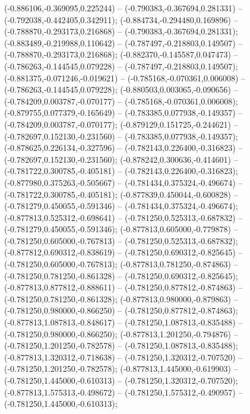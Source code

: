  (-0.886106,-0.369095,0.225244) -- (-0.790383,-0.367694,0.281331) -- (-0.792038,-0.442405,0.342911);
 (-0.884734,-0.294480,0.169896) -- (-0.788870,-0.293173,0.216868) -- (-0.790383,-0.367694,0.281331);
 (-0.883489,-0.219988,0.110642) -- (-0.787497,-0.218803,0.149507) -- (-0.788870,-0.293173,0.216868);
 (-0.882370,-0.145587,0.047473) -- (-0.786263,-0.144545,0.079228) -- (-0.787497,-0.218803,0.149507);
 (-0.881375,-0.071246,-0.019621) -- (-0.785168,-0.070361,0.006008) -- (-0.786263,-0.144545,0.079228);
 (-0.880503,0.003065,-0.090656) -- (-0.784209,0.003787,-0.070177) -- (-0.785168,-0.070361,0.006008);
 (-0.879755,0.077379,-0.165649) -- (-0.783385,0.077938,-0.149357) -- (-0.784209,0.003787,-0.070177);
 (-0.879129,0.151725,-0.244621) -- (-0.782697,0.152130,-0.231560) -- (-0.783385,0.077938,-0.149357);
 (-0.878625,0.226134,-0.327596) -- (-0.782143,0.226400,-0.316823) -- (-0.782697,0.152130,-0.231560);
 (-0.878242,0.300636,-0.414601) -- (-0.781722,0.300785,-0.405181) -- (-0.782143,0.226400,-0.316823);
 (-0.877980,0.375263,-0.505667) -- (-0.781434,0.375324,-0.496674) -- (-0.781722,0.300785,-0.405181);
 (-0.877839,0.450044,-0.600828) -- (-0.781279,0.450055,-0.591346) -- (-0.781434,0.375324,-0.496674);
 (-0.877813,0.525312,-0.698641) -- (-0.781250,0.525313,-0.687832) -- (-0.781279,0.450055,-0.591346);
 (-0.877813,0.605000,-0.779878) -- (-0.781250,0.605000,-0.767813) -- (-0.781250,0.525313,-0.687832);
 (-0.877812,0.690312,-0.838619) -- (-0.781250,0.690312,-0.825645) -- (-0.781250,0.605000,-0.767813);
 (-0.877813,0.781250,-0.874863) -- (-0.781250,0.781250,-0.861328) -- (-0.781250,0.690312,-0.825645);
 (-0.877813,0.877812,-0.888611) -- (-0.781250,0.877812,-0.874863) -- (-0.781250,0.781250,-0.861328);
 (-0.877813,0.980000,-0.879863) -- (-0.781250,0.980000,-0.866250) -- (-0.781250,0.877812,-0.874863);
 (-0.877813,1.087813,-0.848617) -- (-0.781250,1.087813,-0.835488) -- (-0.781250,0.980000,-0.866250);
 (-0.877813,1.201250,-0.794876) -- (-0.781250,1.201250,-0.782578) -- (-0.781250,1.087813,-0.835488);
 (-0.877813,1.320312,-0.718638) -- (-0.781250,1.320312,-0.707520) -- (-0.781250,1.201250,-0.782578);
 (-0.877813,1.445000,-0.619903) -- (-0.781250,1.445000,-0.610313) -- (-0.781250,1.320312,-0.707520);
 (-0.877813,1.575313,-0.498672) -- (-0.781250,1.575312,-0.490957) -- (-0.781250,1.445000,-0.610313);
